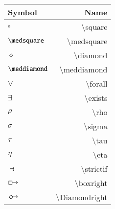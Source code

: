 \documentclass[12pt]{article}
\begin{document}
\begin{multicols}{2}
  \begin{tabular}{| l | r | }
    \hline
    Symbol & Name \\ \hline
	$\square$ & \textbackslash square \\ \hline	
	$\medsquare$ & \textbackslash medsquare \\ \hline		
	$\diamond$ & \textbackslash diamond \\ \hline		
	$\meddiamond$ & \textbackslash meddiamond \\ \hline			
	$\forall$ & \textbackslash forall \\ \hline		
	$\exists$ & \textbackslash exists \\ \hline			
	$\rho$ & \textbackslash rho \\ \hline			
	$\sigma$ & \textbackslash sigma \\ \hline			
	$\tau$ & \textbackslash tau \\ \hline			
	$\eta$ & \textbackslash eta \\ \hline			
	$\strictif$ & \textbackslash strictif \\ \hline			
	$\boxright$ & \textbackslash boxright \\ \hline			
	$\Diamondright$ & \textbackslash Diamondright \\ \hline			
\end{tabular}
\end{multicols}
\end{document}
